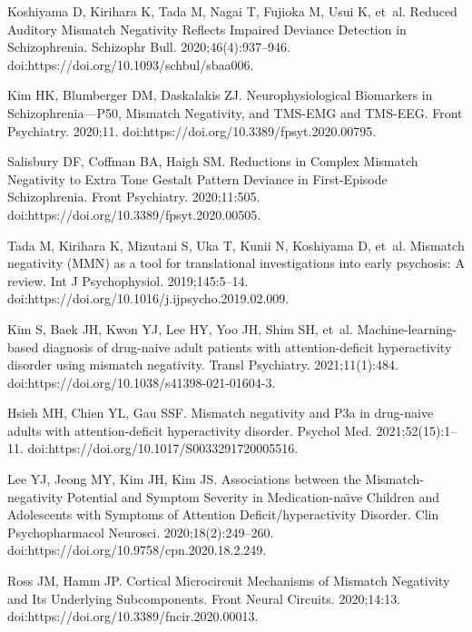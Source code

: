 \documentclass[10pt,letterpaper]{article}
\begin{document}
\begin{thebibliography}{100}
  Koshiyama D, Kirihara K, Tada M, Nagai T, Fujioka M, Usui K, et~al.
  \newblock Reduced Auditory Mismatch Negativity Reflects Impaired Deviance
    Detection in Schizophrenia.
  \newblock Schizophr Bull. 2020;46(4):937--946.
  \newblock doi:{https://doi.org/10.1093/schbul/sbaa006}.
  
  Kim HK, Blumberger DM, Daskalakis ZJ.
  \newblock Neurophysiological Biomarkers in {Schizophrenia---P50}, Mismatch
    Negativity, and {TMS-EMG} and {TMS-EEG}.
  \newblock Front Psychiatry. 2020;11.
  \newblock doi:{https://doi.org/10.3389/fpsyt.2020.00795}.
  
  Salisbury DF, Coffman BA, Haigh SM.
  \newblock Reductions in Complex Mismatch Negativity to Extra Tone Gestalt
    Pattern Deviance in {First-Episode} Schizophrenia.
  \newblock Front Psychiatry. 2020;11:505.
  \newblock doi:{https://doi.org/10.3389/fpsyt.2020.00505}.
  
  Tada M, Kirihara K, Mizutani S, Uka T, Kunii N, Koshiyama D, et~al.
  \newblock Mismatch negativity ({MMN}) as a tool for translational
    investigations into early psychosis: A review.
  \newblock Int J Psychophysiol. 2019;145:5--14.
  \newblock doi:{https://doi.org/10.1016/j.ijpsycho.2019.02.009}.
  
  Kim S, Baek JH, Kwon YJ, Lee HY, Yoo JH, Shim SH, et~al.
  \newblock Machine-learning-based diagnosis of drug-naive adult patients with
    attention-deficit hyperactivity disorder using mismatch negativity.
  \newblock Transl Psychiatry. 2021;11(1):484.
  \newblock doi:{https://doi.org/10.1038/s41398-021-01604-3}.
  
  Hsieh MH, Chien YL, Gau SSF.
  \newblock Mismatch negativity and P3a in drug-naive adults with
    attention-deficit hyperactivity disorder.
  \newblock Psychol Med. 2021;52(15):1--11.
  \newblock doi:{https://doi.org/10.1017/S0033291720005516}.
  
  Lee YJ, Jeong MY, Kim JH, Kim JS.
  \newblock Associations between the Mismatch-negativity Potential and Symptom
    Severity in Medication-na{\"\i}ve Children and Adolescents with Symptoms of
    Attention Deficit/hyperactivity Disorder.
  \newblock Clin Psychopharmacol Neurosci. 2020;18(2):249--260.
  \newblock doi:{https://doi.org/10.9758/cpn.2020.18.2.249}.
  
  Ross JM, Hamm JP.
  \newblock Cortical Microcircuit Mechanisms of Mismatch Negativity and Its
    Underlying Subcomponents.
  \newblock Front Neural Circuits. 2020;14:13.
  \newblock doi:{https://doi.org/10.3389/fncir.2020.00013}.
  

\end{thebibliography}
\end{document}
